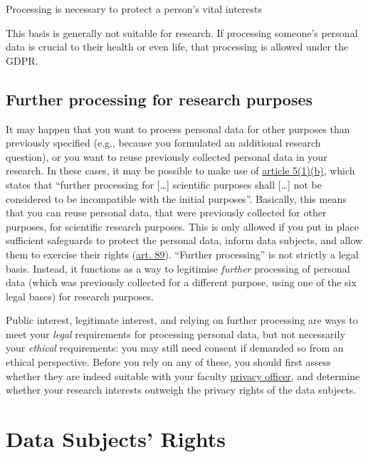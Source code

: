 \documentclass[
]{book}
\begin{document}
Processing is necessary to protect a person's vital interests

This basis is generally not suitable for research. If processing
someone's personal data is crucial to their health or even life, that
processing is allowed under the GDPR.

\hypertarget{further-processing}{%
\subsection{Further processing for research purposes}\label{further-processing}}

It may happen that you want to process personal data for other purposes than
previously specified (e.g., because you formulated an additional research
question), or you want to reuse previously collected personal data in your
research. In these cases, it may be possible to make use of
\href{https://gdpr-info.eu/art-5-gdpr/}{article 5(1)(b)},
which states that ``further processing for {[}\ldots{]} scientific purposes shall {[}\ldots{]}
not be considered to be incompatible with the initial purposes''. Basically, this
means that you can reuse personal data, that were previously collected for other
purposes, for scientific research purposes. This is only allowed if you put in
place sufficient safeguards to protect the personal data, inform data subjects,
and allow them to exercise their rights
(\href{https://gdpr-info.eu/art-89-gdpr/}{art. 89}).
``Further processing'' is not strictly a legal basis. Instead, it functions as a
way to legitimise \emph{further} processing of personal data (which was previously
collected for a different purpose, using one of the six legal bases) for research
purposes.

Public interest, legitimate interest, and relying on further processing are ways
to meet your \emph{legal} requirements for processing personal data, but not
necessarily your \emph{ethical} requirements: you may still need consent if demanded
so from an ethical perspective. Before you rely on any of these, you should
first assess whether they are indeed suitable with your faculty \protect\hyperlink{support}{privacy officer},
and determine whether your research interests outweigh the privacy rights of
the data subjects.

\hypertarget{data-subject-rights}{%
\section{Data Subjects' Rights}\label{data-subject-rights}}
\end{document}
